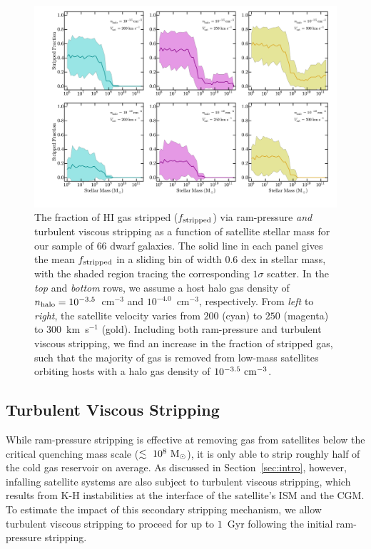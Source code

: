 \documentclass[usenatbib]{mn2e}
\newcommand{\msun}{{\rm M}_{\odot}}
\begin{document}
\begin{figure}
 \centering
 \hspace*{-0.5in}
   \includegraphics[width=7.6in]{f6.pdf}
   \caption{The fraction of H{\scriptsize I} gas stripped ($f_{\rm
       stripped}$) via ram-pressure \emph{and} turbulent viscous
     stripping as a function of satellite stellar mass for our sample
     of $66$ dwarf galaxies. The solid line in each panel gives the
     mean $f_{\rm stripped}$ in a sliding bin of width $0.6$ dex in
     stellar mass, with the shaded region tracing the corresponding
     $1\sigma$ scatter. In the \emph{top} and \emph{bottom} rows, we
     assume a host halo gas density of $n_{\rm
       halo}=10^{-3.5}$~cm$^{-3}$ and $10^{-4.0}$~cm$^{-3}$,
     respectively. From \emph{left} to \emph{right}, the satellite
     velocity varies from $200$ (cyan) to $250$ (magenta) to
     $300$~km~s$^{-1}$ (gold). Including both ram-pressure and
     turbulent viscous stripping, we find an increase in the fraction
     of stripped gas, such that the majority of gas is removed from
     low-mass satellites orbiting hosts with a halo gas density of
     $10^{-3.5}~{\rm cm}^{-3}$.} 
 \label{fig:MW_KH}
\end{figure}



\subsection{Turbulent Viscous Stripping}
\label{subsec:viscous}


While ram-pressure stripping is effective at removing gas from
satellites below the critical quenching mass scale
($\lesssim~10^{8}~\msun$), it is only able to strip roughly half of
the cold gas reservoir on average.
%
As discussed in Section~\ref{sec:intro}, however, infalling satellite
systems are also subject to turbulent viscous stripping, which results
from K-H instabilities at the interface of the satellite's ISM and the
CGM.
%
To estimate the impact of this secondary stripping mechanism, we allow
turbulent viscous stripping to proceed for up to $1$~Gyr following the
initial ram-pressure stripping.
\end{document}
